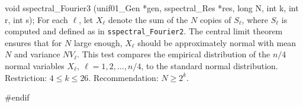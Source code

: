 void sspectral_Fourier3 (unif01_Gen *gen, sspectral_Res *res,
                         long N, int k, int r, int s);
\endcode
\tab
  For each $\ell$, let $X_\ell$ denote the sum of the $N$ copies of $S_\ell$,
  where $S_\ell$ is computed and defined as in {\tt sspectral\_Fourier2}.
  The central limit theorem ensures that for $N$ large enough,
  $X_\ell$ should be approximately normal with mean  %
  $N$ and variance $NV_\ell$. This test compares the empirical
  distribution of the $n/4$ normal variables $X_\ell, \ \ell = 1, 2, \ldots,
  n/4$, to the standard normal distribution.
  Restriction: $4 \le k \le 26$. Recommendation: $N \ge 2^k$.
\endtab
\code

\hide
#endif
\endhide
\endcode
